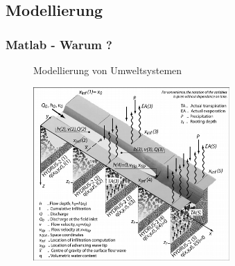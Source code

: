     \subsection{Modellierung}
    \begin{frame}
      \frametitle{Matlab - Warum ?}
      \vspace{-0.8cm}
      \begin{figure}
        Modellierung von Umweltsystemen \par \vspace{0.4cm}
        \includegraphics[width=7.5cm]{modellierung1.png}
      \end{figure}
    \end{frame}

